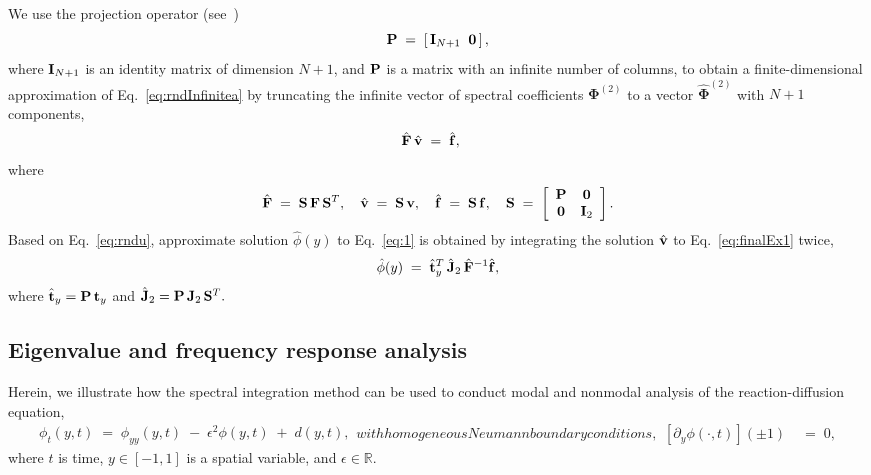 \documentclass[%
secnumarabic,%
 amssymb, amsmath,%
 aps,prf,superscriptaddress,longbibliography
frontmatterverbose,
]{revtex4-2}
\begin{document}
We use the projection operator (see~\cite[Section 2.4]{OlvTowSIAM2013}) 
\begin{equation}\label{eq:project}
  \mathbf{P} \;=\; \left[\,\mathbf I_{N+1}\;\; \mathbf 0 \,\right],
\end{equation}
where $\mathbf I_{N+1}$ is an identity matrix of dimension $N+1$, and $\mathbf{P}$ is a matrix with an infinite number of columns, to obtain a finite-dimensional approximation of Eq.~\eqref{eq:rndInfinitea} by truncating the infinite vector of spectral coefficients $\boldsymbol \Phi^{(2)}$ to a vector $\hat{\boldsymbol \Phi}^{(2)}$ with $N + 1$ components,
\begin{align}\label{eq:finalEx1}
  \hat{\mathbf{F}}\,\hat{\mathbf{v}} \;&=\; \hat{\mathbf{f}},
\end{align}
where
	\begin{align}
	\label{eq:S}
	\hat{\mathbf{F}} \;=\;  \mathbf{S} \,\mathbf{F} \,\mathbf{S}^T, 
	\quad 
	\hat{\mathbf{v}} \;=\; \mathbf{S}\, \mathbf{v}, 
	\quad 
	\hat{\mathbf{f}} \;=\; \mathbf{S}\, \mathbf{f}, 
	\quad 
	\mathbf{S} 
	\;=\; 
	\left[
	\begin{array}{cc}
        \mathbf{P} & \mathbf 0 \\
        \mathbf 0 & \mathbf{I}_2
        \end{array}
        \right].
	\end{align}
Based on Eq.~\eqref{eq:rndu}, approximate solution $\hat{\phi} (y)$ to Eq.~\eqref{eq:1} is obtained by integrating the solution $\hat{\mathbf{v}}$ to Eq.~\eqref{eq:finalEx1} twice,
	\begin{align}
	\label{eq:finalEx}
  	\hat{\phi} (y) 
	\; = \; 
	\hat{\mathbf{t}}_y^T 
	\, 
	\hat{\mathbf J}_2 
	\,
	\hat{\mathbf{F}}^{-1} 
	\hat{\mathbf{f}},
	\end{align}
where
	$
	\hat{\mathbf{t}}_y 
	= 
	\mathbf{P} \, \mathbf{t}_y
	$
and	
	$ 
	\hat {\mathbf{J}}_2 
	= 
	\mathbf{P} \, \mathbf J_2 \, \mathbf{S}^T.
	$

	\vspace*{-5ex}
	\subsection{Eigenvalue and frequency response analysis}

	\vspace*{-2ex}
Herein, we illustrate how the spectral integration method can be used to conduct modal and nonmodal analysis of the reaction-diffusion equation,
	\begin{subequations}
	\label{eq:rndTrans}
	\begin{align}
	\phi_{t}(y,t) 
	\; = \;  
	\phi_{yy}(y,t)  
	\; - \; 
	\epsilon^2 \phi (y,t) 
	\; + \; 
	d(y,t),
	\label{eq:0}
	\end{align}
with homogeneous Neumann boundary conditions,
\begin{align}
[\partial_y \phi (\cdot, t)](\pm 1) \;& =\; 0, \label{eq:0bc}
\end{align}
\end{subequations}
where $t$ is time, $y \in \left[ -1, 1 \right]$ is a spatial variable, and $ \epsilon \in \mathbb{R}$. 
\end{document}

